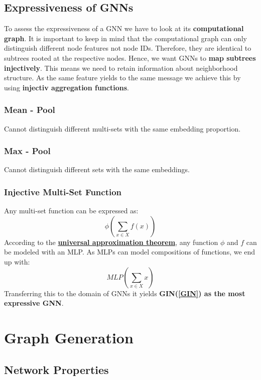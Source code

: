 \documentclass[parskip=full]{scrartcl}
\begin{document}
\subsection{Expressiveness of GNNs}
To assess the expressiveness of a GNN we have to look at its \textbf{computational graph}. It is important to keep in mind that the computational graph can only distinguish different node features not node IDs. Therefore, they are identical to subtrees rooted at the respective nodes.\newline
Hence, we want GNNs to \textbf{map subtrees injectively}. This means we need to retain information about neighborhood structure. As the same feature yields to the same message we achieve this by using \textbf{injectiv aggregation functions}.

\subsubsection{Mean - Pool}
Cannot distinguish different multi-sets with the same embedding proportion.

\subsubsection{Max - Pool}
Cannot distinguish different sets with the same embeddings.

\subsubsection{Injective Multi-Set Function}
Any multi-set function can be expressed as:
\[\phi\left(\sum_{x \in X} f(x)\right)\]
According to the \href{https://deeplearning.cs.cmu.edu/F21/document/readings/Hornik_Stinchcombe_White.pdf}{\textbf{universal approximation theorem}}, any function $\phi$ and $f$ can be modeled with an MLP. As MLPs can model compositions of functions, we end up with:
\[MLP\left(\sum_{x \in X} x\right)\]
Transferring this to the domain of GNNs it yields \textbf{GIN(\ref{GIN}) as the most expressive GNN}.


\section{Graph Generation}

\subsection{Network Properties}
\end{document}
